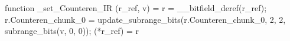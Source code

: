 function _set_Counteren_IR (r_ref, v) = {
    r = __bitfield_deref(r_ref);
    r.Counteren_chunk_0 = update_subrange_bits(r.Counteren_chunk_0, 2, 2, subrange_bits(v, 0, 0));
    (*r_ref) = r
}
